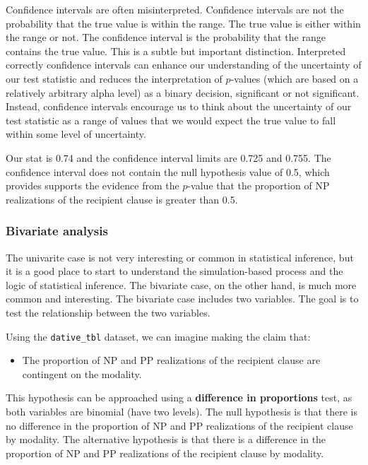 \documentclass[
  letterpaper,
]{book}
\providecommand{\tightlist}{%
  \setlength{\itemsep}{0pt}\setlength{\parskip}{0pt}}\usepackage{longtable,booktabs,array}
\theoremstyle{definition}
\theoremstyle{remark}
\begin{document}
Confidence intervals are often misinterpreted. Confidence intervals are
not the probability that the true value is within the range. The true
value is either within the range or not. The confidence interval is the
probability that the range contains the true value. This is a subtle but
important distinction. Interpreted correctly confidence intervals can
enhance our understanding of the uncertainty of our test statistic and
reduces the interpretation of \(p\)-values (which are based on a
relatively arbitrary alpha level) as a binary decision, significant or
not significant. Instead, confidence intervals encourage us to think
about the uncertainty of our test statistic as a range of values that we
would expect the true value to fall within some level of uncertainty.

Our stat is 0.74 and the confidence interval limits are 0.725 and 0.755.
The confidence interval does not contain the null hypothesis value of
0.5, which provides supports the evidence from the \(p\)-value that the
proportion of NP realizations of the recipient clause is greater than
0.5.

\subsubsection{Bivariate analysis}\label{sec-infer-cat-bivariate}

The univarite case is not very interesting or common in statistical
inference, but it is a good place to start to understand the
simulation-based process and the logic of statistical inference. The
bivariate case, on the other hand, is much more common and interesting.
The bivariate case includes two variables. The goal is to test the
relationship between the two variables.

Using the \texttt{dative\_tbl} dataset, we can imagine making the claim
that:

\begin{itemize}
\tightlist
\item
  The proportion of NP and PP realizations of the recipient clause are
  contingent on the modality.
\end{itemize}

This hypothesis can be approached using a \textbf{difference in
proportions} test, as both variables are binomial (have two levels). The
null hypothesis is that there is no difference in the proportion of NP
and PP realizations of the recipient clause by modality. The alternative
hypothesis is that there is a difference in the proportion of NP and PP
realizations of the recipient clause by modality.
\end{document}
